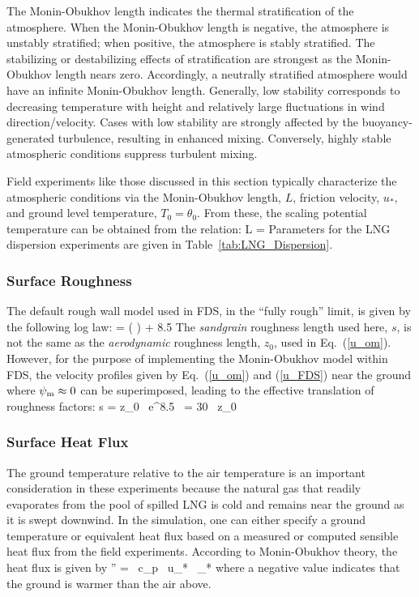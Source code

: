 The Monin-Obukhov length indicates the thermal stratification of the atmosphere.  When the Monin-Obukhov length is negative, the atmosphere is unstably stratified; when positive, the atmosphere is stably stratified.  The stabilizing or destabilizing effects of stratification are strongest as the Monin-Obukhov length nears zero.  Accordingly, a neutrally stratified atmosphere would have an infinite Monin-Obukhov length. Generally, low stability corresponds to decreasing temperature with height and relatively large fluctuations in wind direction/velocity. Cases with low stability are strongly affected by the buoyancy-generated turbulence, resulting in enhanced mixing.  Conversely, highly stable atmospheric conditions suppress turbulent mixing.

Field experiments like those discussed in this section typically characterize the atmospheric conditions via the Monin-Obukhov length, $L$, friction velocity, $u_*$, and ground level temperature, $T_0=\theta_0$. From these, the scaling potential temperature can be obtained from the relation:
\be
   L = 
\ee
Parameters for the LNG dispersion experiments are given in Table~\ref{tab:LNG_Dispersion}.

\subsubsection{Surface Roughness}

The default rough wall model used in FDS, in the ``fully rough'' limit, is given by the following log law:
\be
    =  \ln \left(  \right) + 8.5  \label{u_FDS}
\ee
The \emph{sandgrain} roughness length used here, $s$, is not the same as the \emph{aerodynamic} roughness length, $z_0$, used in Eq.~(\ref{u_om}). However, for the purpose of implementing the Monin-Obukhov model within FDS, the velocity profiles given by Eq.~(\ref{u_om}) and (\ref{u_FDS}) near the ground where $\psi_{\rm m} \approx 0$ can be superimposed, leading to the effective translation of roughness factors:
\be
   s = z_0 \, {\rm e}^{8.5 \, \kappa} = 30 \, z_0
\ee

\subsubsection{Surface Heat Flux}

The ground temperature relative to the air temperature is an important consideration in these experiments because the natural gas that readily evaporates from the pool of spilled LNG is cold and remains near the ground as it is swept downwind. In the simulation, one can either specify a ground temperature or equivalent heat flux based on a measured or computed sensible heat flux from the field experiments. According to Monin-Obukhov theory, the heat flux is given by
\be
   '' = \rho \, c_p \, u_* \, \theta_*
\ee
where a negative value indicates that the ground is warmer than the air above.

